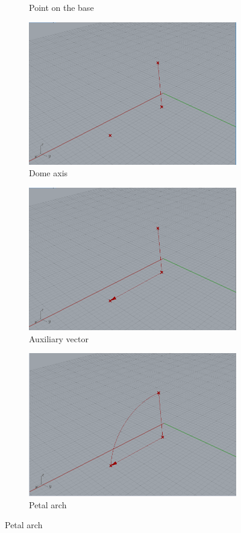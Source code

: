 \documentclass[preprint,12pt,3p]{elsarticle}
\begin{document}
\begin{figure}
\begin{subfigure}{0.3\textwidth}
  \caption{Point on the base}
  \label{fig:a01s02}
\end{subfigure}


\begin{subfigure}{0.3\textwidth}
  \centering
  \includegraphics[width=.9\linewidth]{a01s03.png}
  \caption{Dome axis}
  \label{fig:a01s03}
\end{subfigure}
\begin{subfigure}{0.3\textwidth}
  \centering
  \includegraphics[width=.9\linewidth]{a01s04a.png}
  \caption{Auxiliary vector}
  \label{fig:a01s04a}
\end{subfigure}
\begin{subfigure}{0.3\textwidth}
  \centering
  \includegraphics[width=.9\linewidth]{a01s04b.png}
  \caption{Petal arch}
  \label{fig:a01s04b}
\end{subfigure}



\end{figure}
\end{document}
